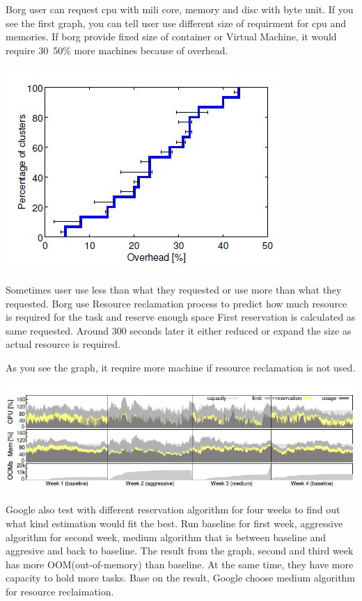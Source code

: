 \documentclass[runningheads,a4paper]{llncs}
\begin{document}
Borg user can request cpu with mili core, memory and disc with byte unit. If you see the first graph, you can tell user use different size of requirment for cpu and memories.
If borg provide fixed size of container or Virtual Machine, it would require 30~50\% more machines because of overhead.

\includegraphics{reclamation1}

 Sometimes user use less than what they requested or use more than what they requested.
Borg use Resource reclamation process to predict how much resource is required for the task and reserve enough space
First reservation is calculated as same requested. Around 300 seconds later it either reduced or expand the size as actual resource is required.

As you see the graph, it require more machine if resource reclamation is not used.

\includegraphics[scale = 0.6]{reclamation2}


Google also test with different reservation algorithm for four weeks to find out what kind estimation would fit the best.
Run baseline for first week, aggressive algorithm for second week, medium algorithm that is between baseline and aggresive and back to baseline.
The result from the graph, second and third week has more OOM(out-of-memory) than baseline.
At the same time, they have more capacity to hold more tasks.
Base on the result, Google choose medium algorithm for resource reclaimation.
\end{document}
